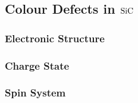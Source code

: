 \cite{Mu2020}


\cite{Wang2019}


\cite{Sardi2020}

\subsection{Colour Defects in $\ce{SiC}$}
\begin{figure}[h]
    \begin{center}
    \end{center}
    \caption{}\label{fig:}
\end{figure}

\subsubsection{Electronic Structure}
\subsubsection{Charge State}
\subsubsection{Spin System}




